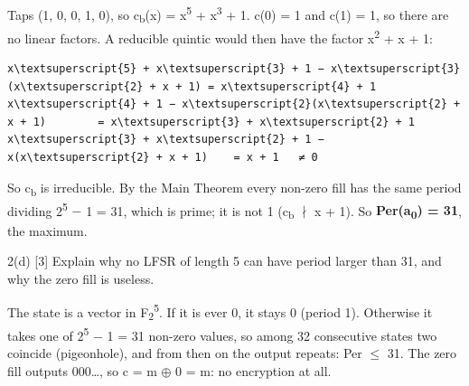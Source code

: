 \documentclass[11pt,a4paper]{article}
\begin{document}
\begin{answer}
Taps (1, 0, 0, 1, 0), so c\textsubscript{b}(x) = x\textsuperscript{5} + x\textsuperscript{3} + 1. c(0) = 1 and c(1) = 1, so there are no linear factors. A reducible quintic would then have the factor x\textsuperscript{2} + x + 1:\par
\begin{workbox}
\begin{Verbatim}[commandchars=\\\{\},fontsize=\footnotesize]
x\textsuperscript{5} + x\textsuperscript{3} + 1 − x\textsuperscript{3}(x\textsuperscript{2} + x + 1) = x\textsuperscript{4} + 1
x\textsuperscript{4} + 1 − x\textsuperscript{2}(x\textsuperscript{2} + x + 1)        = x\textsuperscript{3} + x\textsuperscript{2} + 1
x\textsuperscript{3} + x\textsuperscript{2} + 1 − x(x\textsuperscript{2} + x + 1)    = x + 1   ≠ 0
\end{Verbatim}
\end{workbox}
So c\textsubscript{b} is irreducible. By the Main Theorem every non-zero fill has the same period dividing 2\textsuperscript{5} \ensuremath{-} 1 = 31, which is prime; it is not 1 (c\textsubscript{b} \ensuremath{\nmid} x + 1). So \textbf{Per(a\textsubscript{0}) = 31}, the maximum.\par
\end{answer}
\begin{question}{2(d) \hfill\textnormal{\small [3]}}
Explain why no LFSR of length 5 can have period larger than 31, and why the zero fill is useless.\par
\end{question}
\begin{answer}
The state is a vector in F\textsubscript{2}\textsuperscript{5}. If it is ever 0, it stays 0 (period 1). Otherwise it takes one of 2\textsuperscript{5} \ensuremath{-} 1 = 31 non-zero values, so among 32 consecutive states two coincide (pigeonhole), and from then on the output repeats: Per \ensuremath{\le} 31. The zero fill outputs 000\ldots{}, so c = m \ensuremath{\oplus} 0 = m: no encryption at all.\par
\end{answer}
\end{document}
